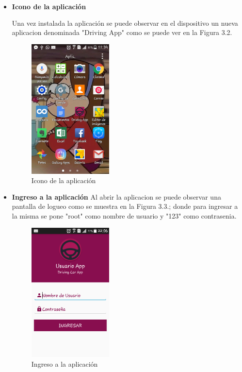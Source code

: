 \begin{itemize}

\item \textbf{Icono de la aplicación}

Una vez instalada la aplicación se puede observar en el dispositivo un nueva aplicacion denominada "Driving App" como se puede ver en la Figura 3.2.

\begin{figure}[h!]
  \begin{center}	\includegraphics[width=0.4\textwidth]{imagenes/iconoapp}
  \caption{Icono de la aplicación}
  \end{center}
\end{figure}

\item \textbf{Ingreso a la aplicación}
Al abrir la aplicacion se puede observar una pantalla de logueo como se muestra en la Figura 3.3.; donde para ingresar a la misma se pone "root"  como nombre de usuario y "123" como contrasenia.
\begin{figure}[h!]
  \begin{center}	\includegraphics[width=0.4\textwidth]{imagenes/inicio}
  \caption{Ingreso a la aplicación}
  \end{center}
\end{figure}


\end{itemize}
